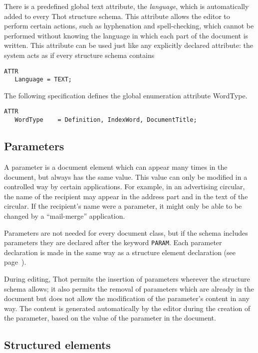 There is a predefined global text attribute, the {\em language}, which
is automatically added to every Thot structure schema.  This attribute
allows the editor to perform certain actions, such as hyphenation and
spell-checking, which cannot be performed without knowing the language
in which each part of the document is written.  This attribute can be
used just like any explicitly declared attribute: the system acts as
if every structure schema contains
\begin{verbatim}
ATTR
   Language = TEXT;
\end{verbatim}

\begin{example}
The following specification defines the global enumeration attribute
WordType.

\begin{verbatim}
ATTR
   WordType    = Definition, IndexWord, DocumentTitle;
\end{verbatim}
\end{example}

\subsection{Parameters}
\label{param}

A parameter is a document element which can appear many times in the
document, but always has the same value.  This value can only be
modified in a controlled way by certain applications.  For example, in
an advertising circular, the name of the recipient may appear in the
address part and in the text of the circular.  If the recipient's name
were a parameter, it might only be able to be changed by a
``mail-merge'' application.

Parameters are not needed for every document class, but if the schema
includes parameters they are declared after the keyword {\tt PARAM}.
Each parameter declaration is made in the same way as a structure
element declaration (see page~\pageref{elemstruct}).

During editing, Thot permits the insertion of parameters wherever the
structure schema allows; it also permits the removal of parameters
which are already in the document but does not allow the modification
of the parameter's content in any way.  The content is generated
automatically by the editor during the creation of the parameter,
based on the value of the parameter in the document.

\subsection{Structured elements}
\label{elemstruct}

